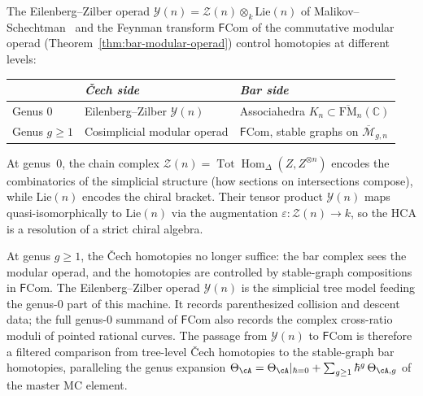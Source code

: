\begin{remark}
\label{rem:ez-operad-controls-ainfty}
The Eilenberg--Zilber operad
$\mathcal{Y}(n) = \mathcal{Z}(n) \otimes_k \mathrm{Lie}(n)$
of Malikov--Schechtman~\cite{MS24} and the Feynman transform
$\mathsf{F}\mathrm{Com}$ of the commutative modular operad
(Theorem~\ref{thm:bar-modular-operad}) control homotopies at
different levels:
\begin{center}
\renewcommand{\arraystretch}{1.2}
\begin{tabular}{lll}
\toprule
& \emph{\v{C}ech side} & \emph{Bar side} \\
\midrule
Genus $0$ & Eilenberg--Zilber $\mathcal{Y}(n)$ &
 Associahedra $K_n \subset \overline{\mathrm{FM}}_n(\mathbb{C})$ \\
Genus $g \geq 1$ & Cosimplicial modular operad &
 $\mathsf{F}\mathrm{Com}$, stable graphs on
 $\overline{\mathcal{M}}_{g,n}$ \\
\bottomrule
\end{tabular}
\end{center}
At genus~$0$, the chain complex
$\mathcal{Z}(n) = \operatorname{Tot}\operatorname{Hom}_\Delta
(Z, Z^{\otimes n})$ encodes the combinatorics of the simplicial
structure (how sections on intersections compose), while
$\mathrm{Lie}(n)$ encodes the chiral bracket. Their tensor product
$\mathcal{Y}(n)$ maps quasi-isomorphically to $\mathrm{Lie}(n)$
via the augmentation
$\varepsilon\colon \mathcal{Z}(n) \to k$,
so the HCA is a resolution of a strict chiral algebra.

At genus $g \geq 1$, the \v{C}ech homotopies no longer suffice:
the bar complex sees the modular operad, and the homotopies are
controlled by stable-graph compositions in
$\mathsf{F}\mathrm{Com}$.  The Eilenberg--Zilber operad
$\mathcal{Y}(n)$ is the simplicial tree model feeding the genus-$0$
part of this machine.  It records parenthesized collision and descent
data; the full genus-$0$ summand of $\mathsf{F}\mathrm{Com}$ also
records the complex cross-ratio moduli of pointed rational curves.
The passage from
$\mathcal{Y}(n)$ to $\mathsf{F}\mathrm{Com}$ is therefore a
filtered comparison from tree-level \v{C}ech homotopies to the
stable-graph bar homotopies, paralleling the genus expansion
$\Theta_{\cA} = \Theta_{\cA}|_{\hbar=0} +
\sum_{g \geq 1}\hbar^g\,\Theta_{\cA,g}$ of the master MC element.
\end{remark}

